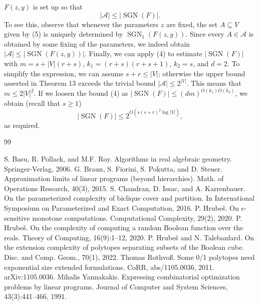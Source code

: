 \documentclass[10pt,a4paper]{article}
\newcommand{\SGN}{\operatorname{SGN}}
\begin{document}
$F(z,y)$ is set up so that
\[|\mathcal A|\le|\SGN(F)|.\]
To see this, observe that whenever the parameters $z$ are fixed, the set $A\subseteq V$ given by (5) is uniquely determined by $\SGN_1(F(z,y))$. Since every $A\in\mathcal A$ is obtained by some fixing of the parameters, we indeed obtain $|\mathcal A|\le|\SGN(F(z,y))|$.
Finally, we can apply (4) to estimate $|\SGN(F)|$ with $m=s+|V|(r+s)$, $k_1=(r+s)(r+s+1)$, $k_2=s$, and $d=2$. To simplify the expression, we can assume $s+r\le|V|$; otherwise the upper bound asserted in Theorem 13 exceeds the trivial bound $|\mathcal A|\le2^{|V|}$. This means that $m\le2|V|^2$. If we loosen the bound (4) as $|\SGN(F)|\le(dm)^{O(k_1)O(k_2)}$, we obtain (recall that $s\ge1$)
\[|\SGN(F)|\le2^{O(s(s+r)^2\log|V|)},\]
as required.

\begin{thebibliography}{99}

 S. Basu, R. Pollack, and M.F. Roy. Algorithms in real algebraic geometry. Springer-Verlag, 2006.
 G. Braun, S. Fiorini, S. Pokutta, and D. Steuer. Approximation limits of linear programs (beyond hierarchies). Math. of Operations Research, 40(3), 2015.
 S. Chandran, D. Issac, and A. Karrenbauer. On the parameterized complexity of biclique cover and partition. In International Symposium on Parameterized and Exact Computation, 2016.
 P. Hrube\v{s}. On $\epsilon$-sensitive monotone computations. Computational Complexity, 29(2), 2020.
 P. Hrube\v{s}. On the complexity of computing a random Boolean function over the reals. Theory of Computing, 16(9):1--12, 2020.
 P. Hrube\v{s} and N. Talebanfard. On the extension complexity of polytopes separating subsets of the Boolean cube. Disc. and Comp. Geom., 70(1), 2022.
 Thomas Rothvo\ss. Some 0/1 polytopes need exponential size extended formulations. CoRR, abs/1105.0036, 2011. arXiv:1105.0036.
 Mihalis Yannakakis. Expressing combinatorial optimization problems by linear programs. Journal of Computer and System Sciences, 43(3):441--466, 1991.

\end{thebibliography}
\end{document}
